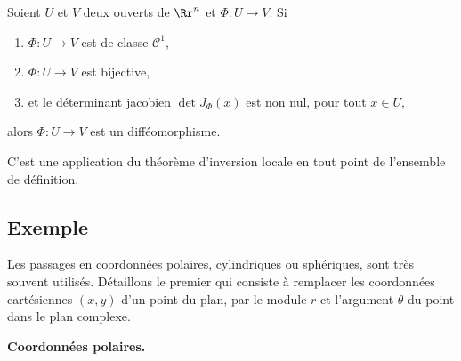 \documentclass[11pt, class=report,crop=false]{standalone}
\begin{document}
\begin{theoreme}
Soient $U$ et $V$ deux ouverts de $\Rr^n$ et $\Phi:U\to V$.
Si 
\begin{enumerate}
     \item $\Phi:U\to V$ est de classe $\mathcal{C}^1$,
     \item $\Phi:U\to V$ est bijective,
     \item et le déterminant jacobien $\det J_\Phi(x)$ est non nul, pour tout $x \in U$, 
    \end{enumerate}
    alors $\Phi : U \to V$ est un difféomorphisme.
\end{theoreme}

C'est une application du théorème d'inversion locale en tout point de l'ensemble de définition.

\subsection{Exemple}



Les passages en coordonnées polaires, cylindriques ou sphériques, sont très souvent utilisés. Détaillons le premier qui consiste à remplacer les coordonnées cartésiennes $(x,y)$ d'un point du plan, par le module $r$ et l'argument $\theta$ du point dans le plan complexe.

  
\textbf{Coordonnées polaires.}
\end{document}
